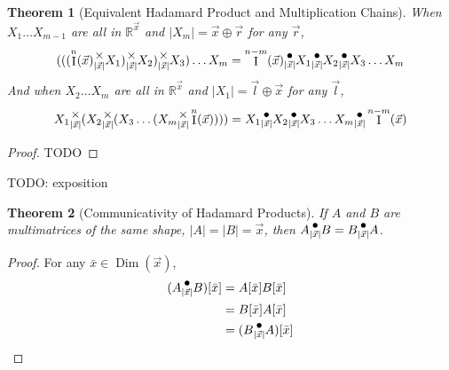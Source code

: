 \documentclass[12pt]{book}
\theoremstyle{plain}
\newtheorem{theorem}{Theorem}[chapter]
\theoremstyle{definition}
\theoremstyle{ppart}
\theoremstyle{case}
\theoremstyle{solution}
\DeclareMathOperator{\Dim}{Dim}
\DeclareMathOperator{\Ident}{I}
\newcommand{\mmult}[1]{\text{\raisebox{1ex}{$\underset{#1}{\times}$}}}
\newcommand{\dmult}[1]{\text{\raisebox{1ex}{$\underset{#1}{\,\bullet\,}$}}}
\newcommand{\shape}[1]{\left|#1\right|}
\begin{document}
\begin{theorem}[Equivalent Hadamard Product and Multiplication Chains]
When $X_1 \ldots X_{m-1}$ are all in $\mathbb{R}^{\vec{x}}$ and
$\shape{X_m} = \vec{x} \oplus \vec{r}$ for any $\vec{r}$,
\[
  (((\Ident^n(\vec{x})
  \mmult{\shape{\vec{x}}} X_1) \mmult{\shape{\vec{x}}} X_2) \mmult{\shape{\vec{x}}} X_3)
  \ldots X_m
  =
  \Ident^{n-m}(\vec{x})
  \dmult{\shape{\vec{x}}} X_1 \dmult{\shape{\vec{x}}} X_2 \dmult{\shape{\vec{x}}} X_3
  \ldots X_m
\]
And when $X_2 \ldots X_m$ are all in $\mathbb{R}^{\vec{x}}$ and
$\shape{X_1} = \vec{l} \oplus \vec{x}$ for any $\vec{l}$,
\[
  X_1 \mmult{\shape{\vec{x}}} (X_2 \mmult{\shape{\vec{x}}} (X_3
  \ldots (X_m \mmult{\shape{\vec{x}}} 
  \Ident^n(\vec{x}))))
  =
  X_1 \dmult{\shape{\vec{x}}} X_2 \dmult{\shape{\vec{x}}} X_3
  \ldots X_m \dmult{\shape{\vec{x}}} 
  \Ident^{n-m}(\vec{x})
\]
\end{theorem}
\begin{proof}
TODO 
\end{proof}

TODO: exposition

\begin{theorem}[Communicativity of Hadamard Products]
If $A$ and $B$ are multimatrices of the same shape, $\shape{A} = \shape{B} = \vec{x}$,
then $A \dmult{\shape{\vec{x}}} B = B \dmult{\shape{\vec{x}}} A$.
\end{theorem}
\begin{proof}
For any $\bar{x} \in \Dim(\vec{x})$,
\begin{align*}
(A \dmult{\shape{\vec{x}}} B)[\bar{x}]
  &= A[\bar{x}] B[\bar{x}] \\
  &= B[\bar{x}] A[\bar{x}] \\
  &= (B \dmult{\shape{\vec{x}}} A)[\bar{x}]
\end{align*}
\end{proof}
\end{document}
